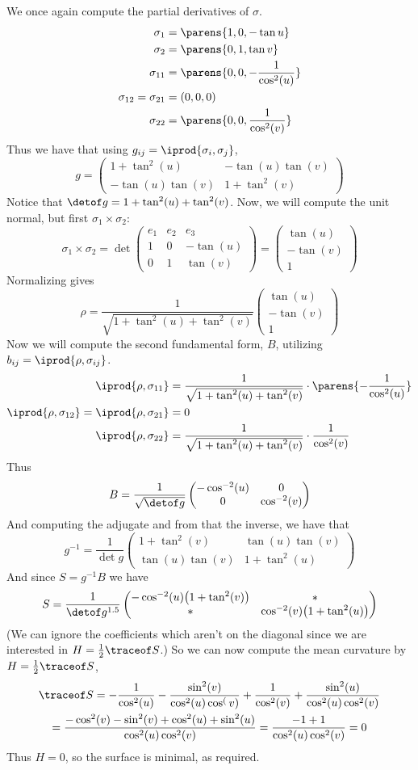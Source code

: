 \documentclass[10pt]{article}
\def\pmat#1{\begin{pmatrix} #1 \end{pmatrix}}
\def\pmat#1{\begin{pmatrix}#1\end{pmatrix}}
\begin{document}
    We once again compute the partial derivatives of $\sigma$.
    \begin{align*}
        \sigma_1 &= \parens{1,0,-\tan u} \\
        \sigma_2 &= \parens{0,1,\tan v} \\
        \sigma_{11} &= \parens{0,0,-\frac1{\cos^2(u)}} \\
        \sigma_{12} = \sigma_{21} &= (0,0,0) \\
        \sigma_{22} &= \parens{0,0,\frac1{\cos^2(v)}}
    \end{align*}
    Thus we have that using $g_{ij}=\iprod{\sigma_i,\sigma_j}$,
    \[ g = \pmat{1+\tan^2(u) & -\tan(u)\tan(v) \\ -\tan(u)\tan(v) & 1+\tan^2(v)} \] 
    Notice that $\detof g=1+\tan^2(u)+\tan^2(v)$.
    Now, we will compute the unit normal, but first $\sigma_1\times\sigma_2$:
    \[ \sigma_1\times\sigma_2 = \det\pmat{e_1 & e_2 & e_3 \\ 1 & 0 & -\tan(u) \\ 0 & 1 & \tan(v)} = \pmat{\tan(u) \\ -\tan(v) \\ 1} \]
    Normalizing gives
    \[ \rho = \frac1{\sqrt{1+\tan^2(u)+\tan^2(v)}}\pmat{\tan(u) \\ -\tan(v) \\ 1} \]
    Now we will compute the second fundamental form, $B$, utilizing $b_{ij}=\iprod{\rho,\sigma_{ij}}$.
    \begin{align*}
        \iprod{\rho,\sigma_{11}} &= \frac1{\sqrt{1+\tan^2(u)+\tan^2(v)}}\cdot\parens{-\frac1{\cos^2(u)}} \\
        \iprod{\rho,\sigma_{12}} = \iprod{\rho,\sigma_{21}} &= 0 \\
        \iprod{\rho,\sigma_{22}} &= \frac1{\sqrt{1+\tan^2(u)+\tan^2(v)}}\cdot\frac1{\cos^2(v)}
    \end{align*}
    Thus
    \[ B = \frac1{\sqrt{\detof g}}\pmat{-\cos^{-2}(u) & 0 \\ 0 & \cos^{-2}(v)} \]
    And computing the adjugate and from that the inverse, we have that
    \[ g^{-1} = \frac1{\det g}\pmat{1+\tan^2(v) & \tan(u)\tan(v) \\ \tan(u)\tan(v) & 1+\tan^2(u)} \]
    And since $S=g^{-1}B$ we have
    \[ S = \frac1{\detof g^{1.5}}\pmat{-\cos^{-2}(u)\bigl(1+\tan^2(v)\bigr) & * \\ * & \cos^{-2}(v)\bigl(1+\tan^2(u)\bigr)} \]
    (We can ignore the coefficients which aren't on the diagonal since we are interested in $H=\frac12\traceof S$.)
    So we can now compute the mean curvature by $H=\frac12\traceof S$,
    \begin{multline*}
        \traceof S = -\frac1{\cos^2(u)} - \frac{\sin^2(v)}{\cos^2(u)\cos^(v)} + \frac1{\cos^2(v)} + \frac{\sin^2(u)}{\cos^2(u)\cos^2(v)} \\
        = \frac{-\cos^2(v)-\sin^2(v)+\cos^2(u)+\sin^2(u)}{\cos^2(u)\cos^2(v)} = \frac{-1+1}{\cos^2(u)\cos^2(v)} = 0
    \end{multline*}
    Thus $H=0$, so the surface is minimal, as required.
\end{document}
